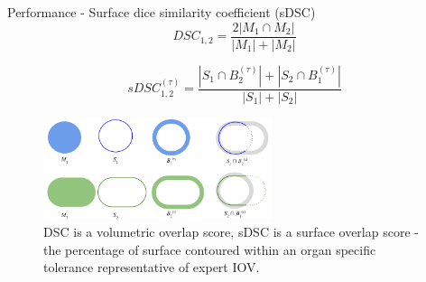 \documentclass[9pt]{beamer}
\begin{document}
\begin{frame}{Performance - Surface dice similarity coefficient (sDSC)}
  \begin{equation*}
    DSC_{1,2} = \frac{2|M_{1} \cap M_{2}|}{|M_{1}| + |M_{2}|}
    \label{eq:sDSC}
  \end{equation*}

  \vspace{4mm}

  \begin{equation*}
    sDSC_{1,2}^{(\tau)} = \frac{|S_{1} \cap B_{2}^{(\tau)}| + |S_{2} \cap B_{1}^{(\tau)}|}{|S_{1}| + |S_{2}|}
    \label{eq:sDSC}
  \end{equation*}

  \vspace{4mm}
  \begin{figure}
    \includegraphics[width=0.6\textwidth]{images/sDSC}

    \caption{DSC is a volumetric overlap score, sDSC is a surface overlap score
      - the percentage of surface contoured within an organ specific tolerance
      representative of expert IOV.\footnotemark[3]}

  \end{figure}
\end{frame}
\end{document}
